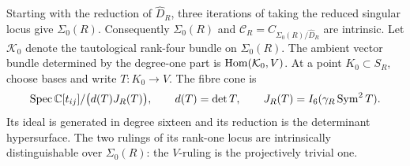 \begin{lemma}
\label{lem:deepest-normal-cone}
Starting with the reduction of \(\widehat D_R\), three iterations
of taking the reduced singular locus give \(\Sigma_0(R)\).
Consequently \(\Sigma_0(R)\) and
\(\mathscr C_R=C_{\Sigma_0(R)/\widehat D_R}\) are intrinsic.
Let \(\mathcal K_0\) denote the tautological rank-four bundle on
\(\Sigma_0(R)\).  The ambient vector bundle determined by the degree-one part is
\(\operatorname{Hom}(\mathcal K_0,V)\).  At a point \(K_0\subset S_R\),
choose bases and write \(T:K_0\to V\).  The fibre cone is
\begin{equation}\label{eq:deepest-cone-equation}
 \operatorname{Spec}\mathbb C[t_{ij}]/\bigl(d(T)J_R(T)\bigr),\qquad
 d(T)=\det T,\qquad J_R(T)=I_6(\gamma_R\operatorname{Sym}^2T).
\end{equation}
Its ideal is generated in degree sixteen and its reduction is the
determinant hypersurface.  The two rulings of its rank-one locus
are intrinsically distinguishable over \(\Sigma_0(R)\): the
\(V\)-ruling is the projectively trivial one.
\end{lemma}
